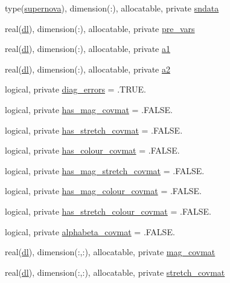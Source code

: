 \begin{DoxyCompactItemize}
type(\mbox{\hyperlink{structjla_1_1supernova}{supernova}}), dimension(\+:), allocatable, private \mbox{\hyperlink{namespacejla_a9e2b90e3f1e2fbd40d61e0ad31bb2684}{sndata}}
\item 
real(\mbox{\hyperlink{namespacejla_a3aa6435b4e08f1d532390186ac608741}{dl}}), dimension(\+:), allocatable, private \mbox{\hyperlink{namespacejla_aa01e50e6176267ba591eec0a0f61bfa2}{pre\+\_\+vars}}
\item 
real(\mbox{\hyperlink{namespacejla_a3aa6435b4e08f1d532390186ac608741}{dl}}), dimension(\+:), allocatable, private \mbox{\hyperlink{namespacejla_af953b413735d88b2fb4acce3a491e092}{a1}}
\item 
real(\mbox{\hyperlink{namespacejla_a3aa6435b4e08f1d532390186ac608741}{dl}}), dimension(\+:), allocatable, private \mbox{\hyperlink{namespacejla_a4745bbeba0b176717566b37123f5a538}{a2}}
\item 
logical, private \mbox{\hyperlink{namespacejla_ab5b550ee0d2130dd40e4e517860a32e3}{diag\+\_\+errors}} = .T\+R\+U\+E.
\item 
logical, private \mbox{\hyperlink{namespacejla_a59c3668ae4a232ee84a102f4ea2515c1}{has\+\_\+mag\+\_\+covmat}} = .F\+A\+L\+S\+E.
\item 
logical, private \mbox{\hyperlink{namespacejla_a41c379420fdf30a15f9f79533c2e9172}{has\+\_\+stretch\+\_\+covmat}} = .F\+A\+L\+S\+E.
\item 
logical, private \mbox{\hyperlink{namespacejla_a5f77e309102810deed32022b4986fcd7}{has\+\_\+colour\+\_\+covmat}} = .F\+A\+L\+S\+E.
\item 
logical, private \mbox{\hyperlink{namespacejla_a5b83e1587462131ae02f6c91ac9831f3}{has\+\_\+mag\+\_\+stretch\+\_\+covmat}} = .F\+A\+L\+S\+E.
\item 
logical, private \mbox{\hyperlink{namespacejla_aab6bb8e29688907bcdf528d8aeb19f04}{has\+\_\+mag\+\_\+colour\+\_\+covmat}} = .F\+A\+L\+S\+E.
\item 
logical, private \mbox{\hyperlink{namespacejla_a32dbd6f4ba90d52437050c67650569cc}{has\+\_\+stretch\+\_\+colour\+\_\+covmat}} = .F\+A\+L\+S\+E.
\item 
logical, private \mbox{\hyperlink{namespacejla_a337800de4314f7309ac0d0fb2f7a0278}{alphabeta\+\_\+covmat}} = .F\+A\+L\+S\+E.
\item 
real(\mbox{\hyperlink{namespacejla_a3aa6435b4e08f1d532390186ac608741}{dl}}), dimension(\+:,\+:), allocatable, private \mbox{\hyperlink{namespacejla_a268b540e94d941747a6f2a4ae9db5fc6}{mag\+\_\+covmat}}
\item 
real(\mbox{\hyperlink{namespacejla_a3aa6435b4e08f1d532390186ac608741}{dl}}), dimension(\+:,\+:), allocatable, private \mbox{\hyperlink{namespacejla_a7244bc3fbb6a94e6d1fe9d0e1fbaaef8}{stretch\+\_\+covmat}}

\end{DoxyCompactItemize}
